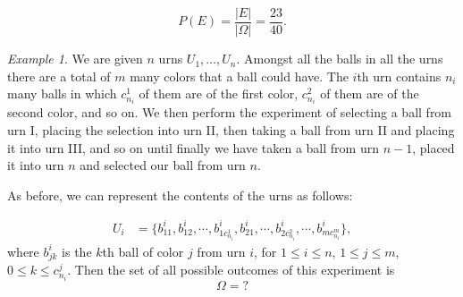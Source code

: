 \documentclass{article}
\theoremstyle{definition}
\theoremstyle{remark}
\theoremstyle{example}
\newtheorem{example}{Example}
\begin{document}
\begin{equation*}
    P(E)=\frac{|E|}{|\Omega|}=\frac{23}{40}.
\end{equation*}
\begin{example}
We are given $n$ urns $U_1, \dots, U_n$. Amongst all the balls in all the urns there are a total of $m$ many colors that a ball could have. The $i$th urn contains $n_i$ many balls in which $c^1_{n_i}$ of them are of the first color, $c^2_{n_i}$ of them are of the second color, and so on. We then perform the experiment of selecting a ball from urn I, placing the selection into urn II, then taking a ball from urn II and placing it into urn III, and so on until finally we have taken a ball from urn $n-1$, placed it into urn $n$ and selected our ball from urn $n$.  
\end{example}

As before, we can represent the contents of the urns as follows:

\begin{align*}
    U_i&=\{b^i_{11}, b^i_{12}, \cdots, b^i_{1c^1_{n_i}}, b^i_{21}, \cdots, b^i_{2c^2_{n_i}}, \cdots, b^i_{mc^m_{n_i}}\} ,
\end{align*}
where $b^i_{jk}$ is the $k$th ball of color $j$ from urn $i$, for $1\leq i\leq n$, $1\leq j\leq m$, $0\leq k\leq c^j_{n_i}$. Then the set of all possible outcomes of this experiment is 
\begin{equation*}
    \Omega=?
\end{equation*}
\end{document}
